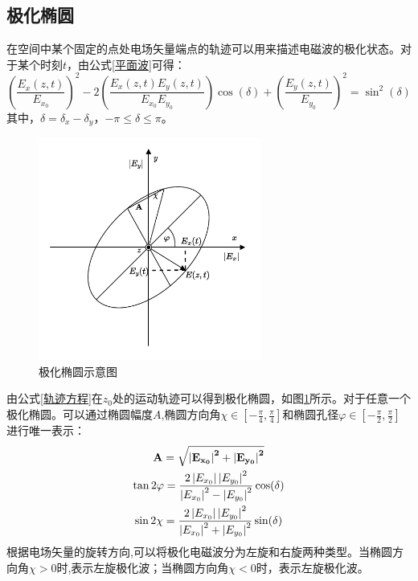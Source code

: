 \subsection{极化椭圆}
在空间中某个固定的点处电场矢量端点的轨迹可以用来描述电磁波的极化状态。对于某个时刻$t$，由公式\eqref{平面波}可得：
\begin{equation}
    \label{轨迹方程}
    \left(\frac{E_x(z, t)}{E_{x_0}}\right)^2-2\left(\frac{E_x(z, t) E_y(z, t)}{E_{x_0} E_{y_0}}\right) \cos (\delta)+\left(\frac{E_y(z, t)}{E_{y_0}}\right)^2=\sin ^2(\delta)
\end{equation}
其中，$\delta=\delta_x-\delta_y$，$-\pi \leqslant \delta \leqslant \pi$。

\begin{figure}[h]
    \includegraphics[width=7.3cm]{pic/chapter2/极化椭圆示意图.pdf}
    \caption{极化椭圆示意图}
    \label{极化椭圆示意图}
\end{figure}

由公式\eqref{轨迹方程}在$z_0$处的运动轨迹可以得到极化椭圆，如图\ref{极化椭圆示意图}所示。对于任意一个极化椭圆。可以通过椭圆幅度$A$,椭圆方向角$\chi \in [-\frac{\pi}{4}, \frac{\pi}{4}]$和椭圆孔径$\varphi \in [-\frac{\pi}{2}, \frac{\pi}{2}]$进行唯一表示：
\begin{gather}
    \bf{A}=\sqrt{\left|E_{x_0}\right|^2+\left|E_{y_0}\right|^2}                                                                \\
    \tan 2 \varphi=\frac{2\left|E_{x_0}\right|\left|E_{y_0}\right|^2}{\left|E_{x_0}\right|^2-\left|E_{y_0}\right|^2} \cos (\delta) \\
    \sin 2 \chi=\frac{2\left|E_{x_0}\right|\left|E_{y_0}\right|^2}{\left|E_{x_0}\right|^2+\left|E_{y_0}\right|^2} \sin (\delta)
\end{gather}
根据电场矢量的旋转方向,可以将极化电磁波分为左旋和右旋两种类型。当椭圆方向角$\chi > 0$时,表示左旋极化波；当椭圆方向角$\chi < 0$时，表示左旋极化波。
